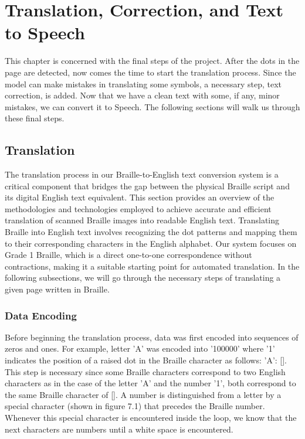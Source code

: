 \section{Translation, Correction, and Text to Speech}

\setcounter{figure}{0}
\renewcommand{\thefigure}{7.\arabic{figure}}


This chapter is concerned with the final steps of the project. After the dots in the page are detected, now comes the time to start the translation process. Since the model can make mistakes in translating some symbols, a necessary step, text correction, is added. Now that we have a clean text with some, if any, minor mistakes, we can convert it to Speech. The following sections will walk us through these final steps.  

\subsection{Translation}

The translation process in our Braille-to-English text conversion system is a critical component that bridges the gap between the physical Braille script and its digital English text equivalent. This section provides an overview of the methodologies and technologies employed to achieve accurate and efficient translation of scanned Braille images into readable English text. Translating Braille into English text involves recognizing the dot patterns and mapping them to their corresponding characters in the English alphabet. Our system focuses on Grade 1 Braille, which is a direct one-to-one correspondence without contractions, making it a suitable starting point for automated translation. In the following subsections, we will go through the necessary steps of translating a given page written in Braille.

\subsubsection{Data Encoding}

Before beginning the translation process, data was first encoded into sequences of zeros and ones. For example, letter 'A' was encoded into '100000' where '1' indicates the position of a raised dot in the Braille character as follows: 'A': []. This step is necessary since some Braille characters correspond to two English characters as in the case of the letter 'A' and the number '1', both correspond to the same Braille character of []. A number is distinguished from a letter by a special character (shown in figure 7.1) that precedes the Braille number. Whenever this special character is encountered inside the loop, we know that the next characters are numbers until a white space is encountered.

